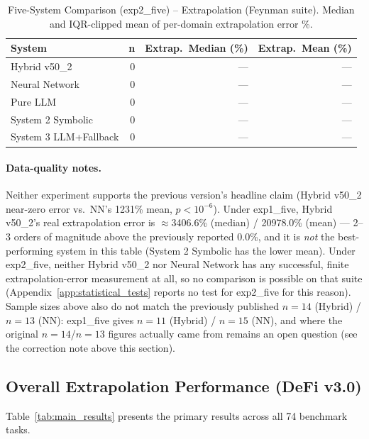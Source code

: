 \documentclass[twoside,11pt]{article}
\begin{document}
\begin{table}[t]
\centering
\caption{Five-System Comparison (exp2\_five) -- Extrapolation (Feynman
  suite). Median and IQR-clipped mean of per-domain extrapolation error \%.}
\label{tab:five_systems_extrapolation_exp2five}
\begin{tabular}{lrrr}
\toprule
\textbf{System} & \textbf{n}
  & \textbf{Extrap.\ Median (\%)} & \textbf{Extrap.\ Mean (\%)} \\
\midrule
Hybrid v50\_2 & 0 & --- & --- \\
Neural Network & 0 & --- & --- \\
Pure LLM & 0 & --- & --- \\
System 2 Symbolic & 0 & --- & --- \\
System 3 LLM+Fallback & 0 & --- & --- \\
\bottomrule
\end{tabular}
\end{table}

\paragraph{Data-quality notes.} Neither experiment supports the previous
version's headline claim (Hybrid v50\_2 near-zero error vs.\ NN's 1231\%
mean, $p<10^{-6}$). Under exp1\_five, Hybrid v50\_2's real extrapolation
error is $\approx$3406.6\% (median) / 20978.0\% (mean) --- 2--3 orders of
magnitude above the previously reported 0.0\%, and it is \emph{not} the
best-performing system in this table (System 2 Symbolic has the lower
mean). Under exp2\_five, neither Hybrid v50\_2 nor Neural Network has any
successful, finite extrapolation-error measurement at all, so no
comparison is possible on that suite (Appendix~\ref{app:statistical_tests}
reports no test for exp2\_five for this reason). Sample sizes above also
do not match the previously published $n=14$ (Hybrid) / $n=13$ (NN):
exp1\_five gives $n=11$ (Hybrid) / $n=15$ (NN), and where the original
$n=14$/$n=13$ figures actually came from remains an open question (see the
correction note above this section).

\subsection{Overall Extrapolation Performance (DeFi v3.0)}\label{subsec:overall-extrapolation-performance-defi-v}
\label{sec:results_defi}

Table~\ref{tab:main_results} presents the primary results across all 74 benchmark tasks.
\end{document}
